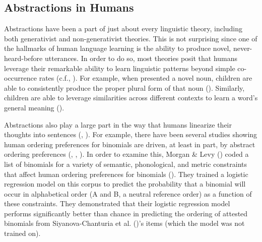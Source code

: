 \documentclass[
  12pt,
  letterpaper,
]{scrreport}
\begin{document}
\subsection{Abstractions in Humans}\label{abstractions-in-humans}

Abstractions have been a part of just about every linguistic theory,
including both generativist and non-generativist theories. This is not
surprising since one of the hallmarks of human language learning is the
ability to produce novel, never-heard-before utterances. In order to do
so, most theories posit that humans leverage their remarkable ability to
learn linguistic patterns beyond simple co-occurrence rates (c.f.,
).
For example, when presented a novel noun, children are able to
consistently produce the proper plural form of that noun
(). Similarly,
children are able to leverage similarities across different contexts to
learn a word's general meaning
().

Abstractions also play a large part in the way that humans linearize
their thoughts into sentences
(, ). For example, there have been
several studies showing human ordering preferences for binomials are
driven, at least in part, by abstract ordering preferences
(,
,
). In order to examine this, Morgan \&
Levy () coded a
list of binomials for a variety of semantic, phonological, and metric
constraints that affect human ordering preferences for binomials
().
They trained a logistic regression model on this corpus to predict the
probability that a binomial will occur in alphabetical order (A and B, a
neutral reference order) as a function of these constraints. They
demonstrated that their logistic regression model performs significantly
better than chance in predicting the ordering of attested binomials from
Siyanova-Chanturia et al.
()'s items
(which the model was not trained on).
\end{document}
